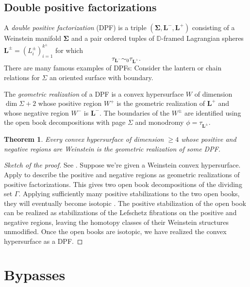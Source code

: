 \documentclass[11pt]{amsart}
\newcommand{\thicc}[1]{\pmb{#1}}
\newcommand{\disk}{\mathbb{D}}
\newcommand{\LagTuple}{\thicc{L}}
\newtheorem{thm}{Theorem}[section]
\begin{document}
\subsection{Double positive factorizations}

A \emph{double positive factorization} (DPF) is a triple $(\thicc{\Sigma}, \LagTuple^{-}, \LagTuple^{+})$ consisting of a Weinstein manifold $\thicc{\Sigma}$ and a pair ordered tuples of $\disk$-framed Lagrangian spheres $\LagTuple^{\pm} = (L^{\pm}_{i})_{i=1}^{k^{\pm}}$ for which
\begin{equation*}
\tau_{\LagTuple^{-}} \sim_{0} \tau_{\LagTuple^{+}}.
\end{equation*}
There are many famous examples of DPFs: Consider the lantern or chain relations for $\Sigma$ an oriented surface with boundary.

The \emph{geometric realization} of a DPF is a convex hypersurface $W$ of dimension $\dim \Sigma + 2$ whose positive region $W^{+}$ is the geometric realization of $\LagTuple^{+}$ and whose negative region $W^{-}$ is $\LagTuple^{-}$. The boundaries of the $W^{\pm}$ are identified using the open book decompositions with page $\Sigma$ and monodromy $\phi = \tau_{\LagTuple^{\pm}}$.

\begin{thm}
Every convex hypersurface of dimension $\geq 4$ whose positive and negative regions are Weinstein is the geometric realization of some DPF.
\end{thm}

\begin{proof}[Sketch of the proof]
See \cite{Breen:Folded}. Suppose we're given a Weinstein convex hypersurface. Apply \cite{BHH:GirouxCorrespondence, GirouxPardon} to describe the positive and negative regions as geometric realizations of positive factorizations. This gives two open book decompositions of the dividing set $\Gamma$. Applying sufficiently many positive stabilizations to the two open books, they will eventually become isotopic \cite{BHH:GirouxCorrespondence}. The positive stabilization of the open book can be realized as stabilizations of the Lefschetz fibrations on the positive and negative regions, leaving the homotopy classes of their Weinstein structures unmodified. Once the open books are isotopic, we have realized the convex hypersurface as a DPF.
\end{proof}

\section{Bypasses}
\end{document}
